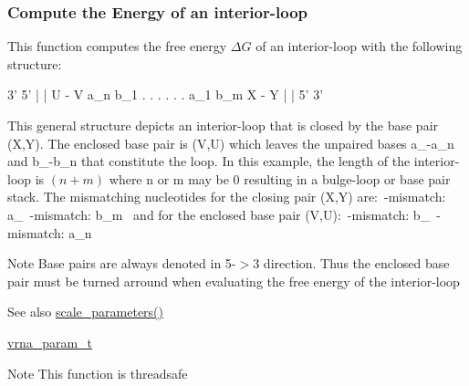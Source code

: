\subsubsection*{Compute the Energy of an interior-\/loop}

This function computes the free energy $\Delta G$ of an interior-\/loop with the following structure\+: ~\newline
 
\begin{DoxyPre}
      3'  5'
      |   |
      U - V
  a\_n       b\_1
   .        .
   .        .
   .        .
  a\_1       b\_m
      X - Y
      |   |
      5'  3'
\end{DoxyPre}
 This general structure depicts an interior-\/loop that is closed by the base pair (X,Y). The enclosed base pair is (V,U) which leaves the unpaired bases a\+\_-\/a\+\_\+n and b\+\_-\/b\+\_\+n that constitute the loop. In this example, the length of the interior-\/loop is $(n+m)$ where n or m may be 0 resulting in a bulge-\/loop or base pair stack. The mismatching nucleotides for the closing pair (X,Y) are\+:~\textquotesingle{}-\/mismatch\+: a\+\_~\textquotesingle{}-\/mismatch\+: b\+\_\+m~\newline
 and for the enclosed base pair (V,U)\+:~\textquotesingle{}-\/mismatch\+: b\+\_~\textquotesingle{}-\/mismatch\+: a\+\_\+n~\newline
 \begin{DoxyNote}{Note}
Base pairs are always denoted in 5\textquotesingle{}-\/$>$3\textquotesingle{} direction. Thus the enclosed base pair must be \textquotesingle{}turned arround\textquotesingle{} when evaluating the free energy of the interior-\/loop 
\end{DoxyNote}
\begin{DoxySeeAlso}{See also}
\mbox{\hyperlink{group__energy__parameters_ga541f2cf7436e9bc939b0a49b24baf987}{scale\+\_\+parameters()}} 

\mbox{\hyperlink{group__energy__parameters_ga8a69ca7d787e4fd6079914f5343a1f35}{vrna\+\_\+param\+\_\+t}} 
\end{DoxySeeAlso}
\begin{DoxyNote}{Note}
This function is threadsafe
\end{DoxyNote}

